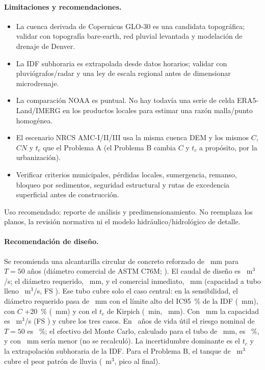 \paragraph{Limitaciones y recomendaciones.}
\begin{itemize}
  \item La cuenca derivada de Copernicus GLO-30 es una candidata topográfica; validar con topografía bare-earth, red
  pluvial levantada y modelación de drenaje de Denver.
  \item La IDF subhoraria es extrapolada desde datos horarios; validar con pluviógrafos/radar y una ley de escala
  regional antes de dimensionar microdrenaje.
  \item La comparación NOAA es puntual. No hay todavía una serie de celda ERA5-Land/IMERG en los productos locales para
  estimar una razón malla/punto homogénea.
  \item El escenario NRCS AMC-I/II/III usa la misma cuenca DEM y los mismos $C$, $CN$ y $t_c$ que el Problema A (el
  Problema B cambia $C$ y $t_c$ a propósito, por la urbanización).
  \item Verificar criterios municipales, pérdidas locales, sumergencia, remanso, bloqueo por sedimentos, seguridad
  estructural y rutas de excedencia superficial antes de construcción.
\end{itemize}
Uso recomendado: reporte de análisis y predimensionamiento. No reemplaza los planos, la revisión normativa ni el modelo
hidráulico/hidrológico de detalle.

\paragraph{Recomendación de diseño.}
Se recomienda una alcantarilla circular de concreto reforzado de \pdosDrec~mm para $T=50$ años (diámetro
comercial de ASTM C76M; \citealp{astm_c76m}). El caudal de diseño es \pdosQ~m$^3$/s; el diámetro requerido,
\pdosDreq~mm, y el comercial inmediato, \pdosDnom~mm (capacidad a tubo lleno \pdosQcnom~m$^3$/s, FS \pdosFSnom). Ese
tubo cubre solo el caso central: en la sensibilidad, el diámetro requerido pasa de \pdosDnom~mm con el límite alto del
IC95~\% de la IDF (\pdosDidfAlta~mm), con $C$ +20~\% (\pdosDcAlto~mm) y con el $t_c$ de Kirpich (\pdosTcKirpich~min,
\pdosDmaxSens~mm). Con \pdosDrec~mm la capacidad es \pdosQcrec~m$^3$/s (FS \pdosFSrec) y cubre los tres casos. En
\pdosVida~años de vida útil el riesgo nominal de $T=50$ es \pdosRiesgoNom~\%; el efectivo del Monte Carlo, calculado
para el tubo de \pdosDnom~mm, es \pdosRiesgoEf~\%, y con \pdosDrec~mm sería menor (no se recalculó). La incertidumbre
dominante es el $t_c$ y la extrapolación subhoraria de la IDF. Para el Problema B, el tanque de \pdosVtanque~m$^3$ cubre
el peor patrón de lluvia (\pdosVpeor~m$^3$, pico al final).

